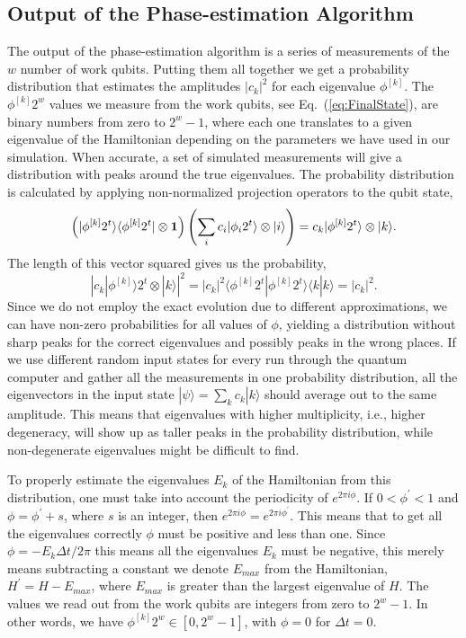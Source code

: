 \subsection{Output of the Phase-estimation Algorithm}
\label{sec:output}
The output of the phase-estimation algorithm is a series of
measurements of the $w$ number of work qubits. Putting them all together
we get a
probability distribution that estimates the amplitudes $|c_k|^2$ for
each eigenvalue $\phi^{[k]}$.
The $\phi^{[k]}2^w$ 
values we measure from the work qubits, see Eq.~(\ref{eq:FinalState}),  
are  binary numbers from zero to $2^w-1$,
where each one translates to a given eigenvalue of the Hamiltonian depending
on the parameters we have used in our simulation. 
When accurate, a set of simulated
measurements will give a distribution with peaks around the true
eigenvalues. 
The probability
distribution is calculated by applying non-normalized projection
operators to the qubit state,
\[
	\left(| \phi^{[k]}2^t\rangle \langle\phi^{[k]}2^t | \otimes  {\bf 1} \right)
	\left( \sum_{i}c_i |\phi_i 2^t\rangle \otimes |i\rangle \right)
	= c_k|\phi^{[k]} 2^t\rangle \otimes |k\rangle.
\]
The length of this vector squared
gives us the probability,
\begin{equation}
	\left|c_k |\phi^{[k]}\rangle 2^t \otimes |k\rangle \right|^2=|c_k|^2 
	\langle \phi^{[k]} 2^t|\phi^{[k]} 2^t\rangle\langle k |k \rangle= |c_k|^2.
\end{equation} 
Since we do not employ the exact evolution due to different
approximations, we can have non-zero 
probabilities for all values of $\phi$, yielding a distribution
without sharp peaks for the correct eigenvalues and possibly peaks in
the wrong places. If we use different random input states for every
run through the quantum computer and gather
all the measurements in
one probability distribution, all the eigenvectors in the input state
$|\psi\rangle=\sum_k c_k | k\rangle$ should average out to the same amplitude.
This means that eigenvalues with higher multiplicity, i.e., higher
degeneracy, will show up as taller peaks in the probability distribution, 
while non-degenerate eigenvalues might be difficult to find.

To properly estimate the eigenvalues
$E_k$ of the Hamiltonian from this distribution, one must take into account the
periodicity of $e^{2\pi i\phi}$. If $0 < \phi^\prime < 1$ and $\phi =
\phi^\prime +s$, where $s$ is an integer, then
$e^{2\pi i\phi}=e^{2\pi i\phi^\prime}$. This means that to get all
the eigenvalues correctly $\phi$ must be positive and less than one.
Since $\phi = -E_k \Delta t/2\pi$ this means all the eigenvalues $E_k$
must be negative, this merely means subtracting a constant we denote 
$E_{max}$ from the Hamiltonian, $H^\prime = H -E_{max}$, where
$E_{max}$ is greater than the largest eigenvalue of $H$. 
The values we read out from the work qubits are integers from zero to
$2^w-1$. In other words, we have
$\phi^{[k]}2^w\in [0, 2^w-1]$, with $\phi=0$ for $\Delta t=0$. 

